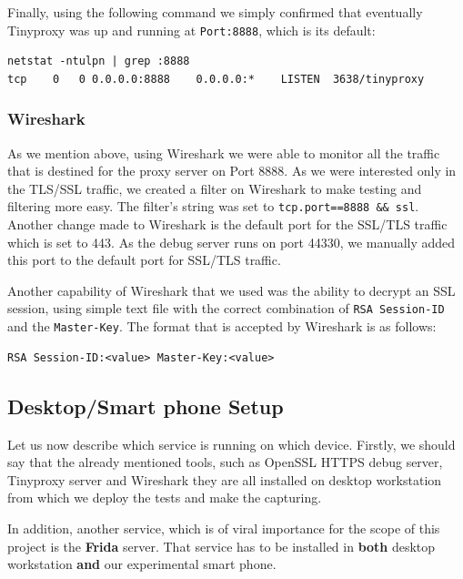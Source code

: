 \documentclass[12pt, a4paper]{report}
\begin{document}
Finally, using the following command we simply confirmed that eventually Tinyproxy was up and running at \texttt{Port:8888}, which is its default:

\begin{lstlisting}[frame=single, breaklines=true]
netstat -ntulpn | grep :8888
tcp    0   0 0.0.0.0:8888    0.0.0.0:*    LISTEN  3638/tinyproxy
\end{lstlisting}

\subsubsection{Wireshark}

As we mention above, using Wireshark we were able to monitor all the traffic  that is destined for the proxy server on Port 8888. As we were interested only in the TLS/SSL traffic, we created a filter on Wireshark to make testing and filtering more easy. The filter's string was set to \texttt{tcp.port==8888 \&\& ssl}. Another change made to Wireshark is the default port for the SSL/TLS traffic which is set to 443. As the debug server runs on port 44330, we manually added this port to the default port for SSL/TLS traffic.  

Another capability of Wireshark that we used was the ability to decrypt an SSL session, using simple text file with the correct combination of \texttt{RSA Session-ID} and the \texttt{Master-Key}. The format that is accepted by Wireshark is as follows:
\begin{lstlisting}[frame=single, breaklines=true]
RSA Session-ID:<value> Master-Key:<value>		
\end{lstlisting}

\subsection{Desktop/Smart phone Setup}

Let us now describe which service is running on which device. Firstly, we should say that the already mentioned tools, such as OpenSSL HTTPS debug server, Tinyproxy server and Wireshark they are all installed on desktop workstation from which we deploy the tests and make the capturing.

In addition, another service, which is of viral importance for the scope of this project is the \textbf{Frida} server. That service has to be installed in \textbf{both} desktop workstation \textbf{and} our experimental smart phone.
\end{document}

